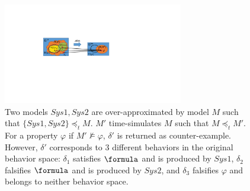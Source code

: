 %


\begin{figure}[!t]
		\centering
		\includegraphics[width=0.7\textwidth]{figs/SysVSEnv.pdf}
		\caption{\small Two models $Sys1,Sys2$ are over-approximated by model $M$ such that $\{Sys1,Sys2\}\preceq_t M$. $M'$ time-simulates $M$ such that $M\preceq_t M'$. For a property $\varphi$ if $M'\not\models\varphi$, $\delta'$ is returned as counter-example. However, $\delta'$ corresponds to 3 different behaviors in the original behavior space: $\delta_1$ satisfies $\formula$ and is produced by $Sys1$, $\delta_2$ falsifies $\formula$ and is produced by $Sys2$, and $\delta_3$ falsifies $\varphi$ and belongs to neither behavior space.}
		  \vspace{-15pt}
		\label{fig:ambiguity}
\end{figure}

